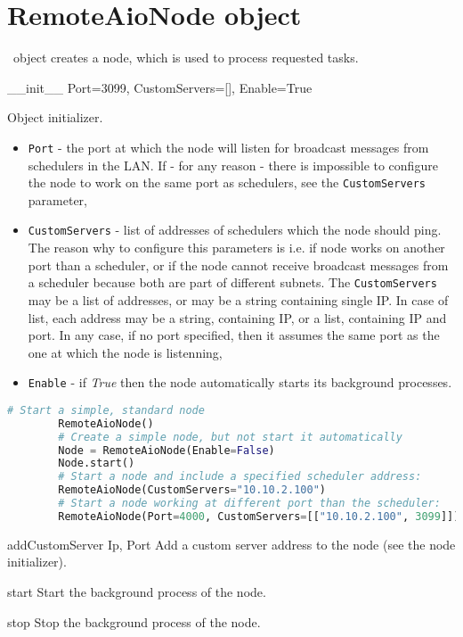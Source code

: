\section{RemoteAioNode object}

\RemoteAioNode\ object creates a node, which is used to process requested tasks.

 {\_\_init\_\_} {Port=3099, CustomServers=[], Enable=True} {
	Object initializer.
	\begin{itemize}
		\item \texttt{Port} - the port at which the node will listen for broadcast messages from schedulers in the LAN. If - for any reason - there is impossible to configure the node to work on the same port as schedulers, see the \texttt{CustomServers} parameter,
		\item \texttt{CustomServers} - list of addresses of schedulers which the node should ping. The reason why to configure this parameters is i.e. if node works on another port than a scheduler, or if the node cannot receive broadcast messages from a scheduler because both are part of different subnets. The \texttt{CustomServers} may be a list of addresses, or may be a string containing single IP. In case of list, each address may be a string, containing IP, or a list, containing IP and port. In any case, if no port specified, then it assumes the same port as the one at which the node is listenning,
		\item \texttt{Enable} - if \textit{True} then the node automatically starts its background processes.
	\end{itemize}
}
\begin{lstlisting}[language=Python]
		# Start a simple, standard node
		RemoteAioNode()
		# Create a simple node, but not start it automatically
		Node = RemoteAioNode(Enable=False)
		Node.start()
		# Start a node and include a specified scheduler address:
		RemoteAioNode(CustomServers="10.10.2.100")
		# Start a node working at different port than the scheduler:
		RemoteAioNode(Port=4000, CustomServers=[["10.10.2.100", 3099]])
\end{lstlisting}

 {addCustomServer} {Ip, Port} {
	Add a custom server address to the node (see the node initializer).
}

 {start} {} {
	Start the background process of the node.
}

 {stop} {} {
	Stop the background process of the node.
}

